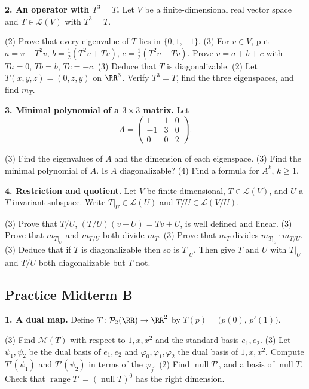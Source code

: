 \documentclass[10pt]{scrartcl}
\DeclareMathOperator{\nul}{null}
\DeclareMathOperator{\range}{range}
\newcommand{\LL}{\mathcal L}
\newcommand{\PP}{\mathcal P}
\newcommand{\MM}{\mathcal M}
\begin{document}
\medskip\noindent\textbf{2. An operator with $T^3=T$.} Let $V$ be a finite-dimensional real vector space and $T\in\LL(V)$ with $T^3=T$.
\begin{enumerate}[a)]
  \ii (2) Prove that every eigenvalue of $T$ lies in $\{0,1,-1\}$.
  \ii (3) For $v\in V$, put $a=v-T^2v$, $b=\tfrac12(T^2v+Tv)$, $c=\tfrac12(T^2v-Tv)$. Prove $v=a+b+c$ with $Ta=0$, $Tb=b$, $Tc=-c$.
  \ii (3) Deduce that $T$ is diagonalizable.
  \ii (2) Let $T(x,y,z)=(0,z,y)$ on $\RR^3$. Verify $T^3=T$, find the three eigenspaces, and find $m_T$.
\end{enumerate}

\medskip\noindent\textbf{3. Minimal polynomial of a $3\times3$ matrix.} Let
\[ A=\begin{pmatrix}1&1&0\\-1&3&0\\0&0&2\end{pmatrix}. \]
\begin{enumerate}[a)]
  \ii (3) Find the eigenvalues of $A$ and the dimension of each eigenspace.
  \ii (3) Find the minimal polynomial of $A$. Is $A$ diagonalizable?
  \ii (4) Find a formula for $A^k$, $k\ge1$.
\end{enumerate}

\medskip\noindent\textbf{4. Restriction and quotient.} Let $V$ be finite-dimensional, $T\in\LL(V)$, and $U$ a $T$-invariant subspace. Write $T|_U\in\LL(U)$ and $T/U\in\LL(V/U)$.
\begin{enumerate}[a)]
  \ii (3) Prove that $T/U$, $(T/U)(v+U)=Tv+U$, is well defined and linear.
  \ii (3) Prove that $m_{T|_U}$ and $m_{T/U}$ both divide $m_T$.
  \ii (3) Prove that $m_T$ divides $m_{T|_U}\cdot m_{T/U}$.
  \ii (3) Deduce that if $T$ is diagonalizable then so is $T|_U$. Then give $T$ and $U$ with $T|_U$ and $T/U$ both diagonalizable but $T$ not.
\end{enumerate}

\endgroup
\clearpage\begingroup\subsection{Practice Midterm B}

\medskip\noindent\textbf{1. A dual map.} Define $T\colon\PP_2(\RR)\to\RR^2$ by $T(p)=\big(p(0),\,p'(1)\big)$.
\begin{enumerate}[a)]
  \ii (3) Find $\MM(T)$ with respect to $1,x,x^2$ and the standard basis $e_1,e_2$.
  \ii (3) Let $\psi_1,\psi_2$ be the dual basis of $e_1,e_2$ and $\varphi_0,\varphi_1,\varphi_2$ the dual basis of $1,x,x^2$. Compute $T'(\psi_1)$ and $T'(\psi_2)$ in terms of the $\varphi_j$.
  \ii (2) Find $\nul T'$, and a basis of $\nul T$. Check that $\range T'=(\nul T)^0$ has the right dimension.
\end{enumerate}
\end{document}
